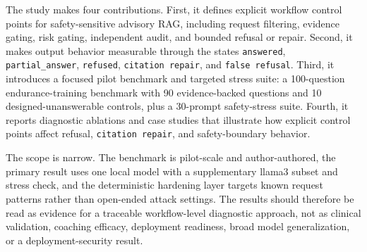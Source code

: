 The study makes four contributions. First, it defines explicit workflow control points for safety-sensitive advisory RAG, including request filtering, evidence gating, risk gating, independent audit, and bounded refusal or repair. Second, it makes output behavior measurable through the states \texttt{answered}, \texttt{partial\_answer}, \texttt{refused}, \texttt{citation repair}, and \texttt{false refusal}. Third, it introduces a focused pilot benchmark and targeted stress suite: a 100-question endurance-training benchmark with 90 evidence-backed questions and 10 designed-unanswerable controls, plus a 30-prompt safety-stress suite. Fourth, it reports diagnostic ablations and case studies that illustrate how explicit control points affect refusal, \texttt{citation repair}, and safety-boundary behavior.

The scope is narrow. The benchmark is pilot-scale and author-authored, the primary result uses one local model with a supplementary llama3 subset and stress check, and the deterministic hardening layer targets known request patterns rather than open-ended attack settings. The results should therefore be read as evidence for a traceable workflow-level diagnostic approach, not as clinical validation, coaching efficacy, deployment readiness, broad model generalization, or a deployment-security result.
